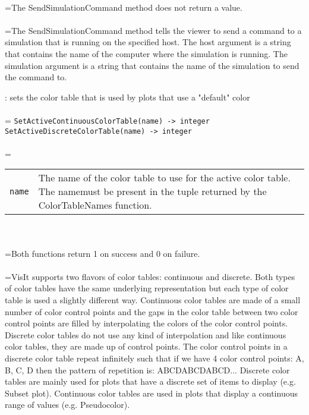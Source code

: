 \documentclass[10pt,a4paper]{report}
\begin{document}
 \\ 
\hangindent=\parindent The SendSimulationCommand method does not return a value. \\[-3mm] 

 \\ 
\hangindent=\parindent The SendSimulationCommand method tells the viewer to send a command to a simulation that is running on the specified host. The host argument is a string that contains the name of the computer where the simulation is running. The simulation argument is a string that contains the name of the simulation to send the command to. \\[-3mm] 

\newpage


{}
: sets the color table that is used by plots that use a "default" color\\[-3mm]

 \\ 
\hangindent=\parindent 
\verb!SetActiveContinuousColorTable(name) -> integer!\\ 
\verb!SetActiveDiscreteColorTable(name) -> integer!\\ [-3mm]

 \\ 
\hangindent=\parindent 
\begin{tabular}{lp{9cm}}
\verb!name! & The name of the color table to use for the active color table. The namemust be present in the tuple returned by the ColorTableNames function. \\
\end{tabular} \\[-2mm]


 \\ 
\hangindent=\parindent Both functions return 1 on success and 0 on failure. \\[-3mm] 

 \\ 
\hangindent=\parindent VisIt supports two flavors of color tables: continuous and discrete. Both types of color tables have the same underlying representation but each type of color table is used a slightly different way. Continuous color tables are made of a small number of color control points and the gaps in the color table between two color control points are filled by interpolating the colors of the color control points. Discrete color tables do not use any kind of interpolation and like continuous color tables, they are made up of control points. The color control points in a discrete color table repeat infinitely such that if we have 4 color control points: A, B, C, D then the pattern of repetition is: ABCDABCDABCD... Discrete color tables are mainly used for plots that have a discrete set of items to display (e.g. Subset plot). Continuous color tables are used in plots that display a continuous range of values (e.g. Pseudocolor). \\[-3mm] 
\end{document}
